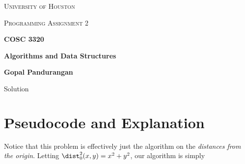 \documentclass[draft]{article}
\begin{document}
\begin{titlepage}
    \begin{center}
        {\scshape\LARGE University of Houston\par}
        \vspace{1cm}
        {\scshape\Large Programming Assignment 2 \par}
        \vspace{1.5cm}
        {\huge\bfseries COSC 3320 \par}
        {\huge\bfseries Algorithms and Data Structures \par}
        \vspace{0.5cm}
        {\large\bfseries Gopal Pandurangan\par}
        \vspace{2cm}
        {\Large Solution\par}
    \end{center}
\end{titlepage}



\section{Pseudocode and Explanation}
Notice that this problem is effectively just the  algorithm on the \emph{distances from the origin}. Letting $\dist_0^2(x,y) = x^2+y^2$, our algorithm is simply
\end{document}
